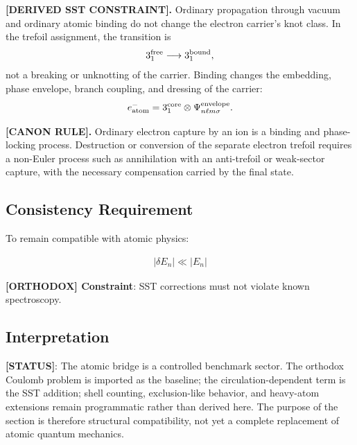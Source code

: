 \documentclass[11pt]{article}
\theoremstyle{definition}
\theoremstyle{plain}
\theoremstyle{remark}
\begin{document}
        \textbf{[DERIVED SST CONSTRAINT].}
        Ordinary propagation through vacuum and ordinary atomic binding do not
        change the electron carrier's knot class. In the trefoil assignment, the
        transition is
        \begin{align}
            3_1^{\rm free}
            \longrightarrow
            3_1^{\rm bound},
            \label{eq:free_to_bound_trefoil}
        \end{align}
        not a breaking or unknotting of the carrier. Binding changes the embedding,
        phase envelope, branch coupling, and dressing of the carrier:
        \begin{align}
            e^-_{\rm atom}
            =
            3_1^{\rm core}
            \otimes
            \Psi_{n\ell m\sigma}^{\rm envelope}.
            \label{eq:atomic_electron_trefoil_tensor_envelope}
        \end{align}

        \textbf{[CANON RULE].}
        Ordinary electron capture by an ion is a binding and phase-locking process.
        Destruction or conversion of the separate electron trefoil requires a
        non-Euler process such as annihilation with an anti-trefoil or weak-sector
        capture, with the necessary compensation carried by the final state.

    \subsection{Consistency Requirement}
        
        To remain compatible with atomic physics:
        
        \begin{align}
            |\delta E_n| \ll |E_n|
        \end{align}
        
        \textbf{[ORTHODOX] Constraint}: SST corrections must not violate known spectroscopy.
    
    \subsection{Interpretation}
        
        \textbf{[STATUS]}: The atomic bridge is a controlled benchmark sector. The orthodox Coulomb problem is imported as the baseline; the circulation-dependent term is the SST addition; shell counting, exclusion-like behavior, and heavy-atom extensions remain programmatic rather than derived here. The purpose of the section is therefore structural compatibility, not yet a complete replacement of atomic quantum mechanics.
\end{document}
